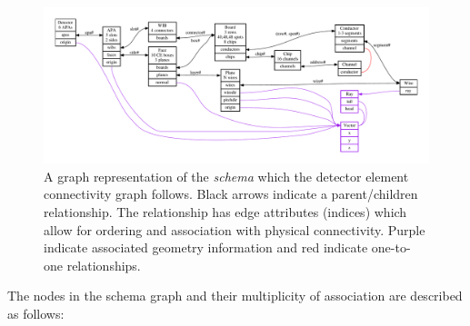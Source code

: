 \documentclass[pdftex,12pt,letter]{article}
\begin{document}
\begin{figure}[h]
  \centering
  \includegraphics[width=\textwidth]{dots/schema2.pdf}
  \caption[Connectivity schema graph.]{A graph representation of the \textit{schema} which the detector element connectivity graph follows.  Black arrows indicate a parent/children relationship.  The relationship has edge attributes (indices) which allow for ordering and association with physical connectivity.   Purple indicate associated geometry information and red indicate one-to-one relationships. }
  \label{fig:schema}
\end{figure}

\pagebreak

\noindent The nodes in the schema graph and their multiplicity of association
are described as follows:
\end{document}
